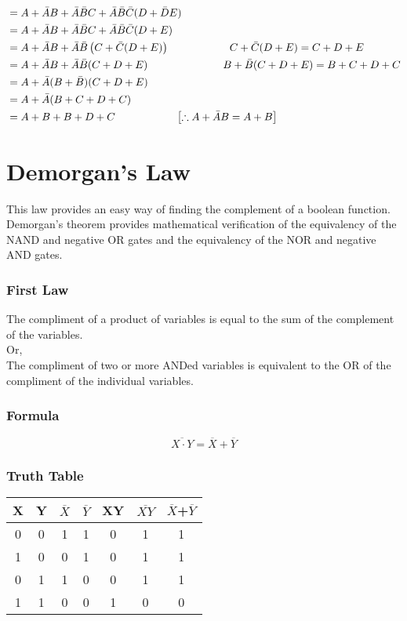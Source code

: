 \begin{answer}
	\begin{align*}
	&=A+\bar{A}B+\bar{A}\bar{B}C+\bar{A}\bar{B}\bar{C}(D+\bar{D}E)\\
	&=A+\bar{A}B+\bar{A}\bar{B}C+\bar{A}\bar{B}\bar{C}(D+E)\\
	&=A+\bar{A}B+\bar{A}\bar{B}\left( C+\bar{C}(D+E)\right) \hspace{2cm}C+\bar{C}(D+E)=C+D+E\\
	&=A+\bar{A}B+\bar{A}\bar{B}(C+D+E)\hspace{2.5cm}B+\bar{B}(C+D+E)=B+C+D+C\\
	&=A+\bar{A}(B+\bar{B})(C+D+E)\\
	&=A+\bar{A}(B+C+D+C)\\
	&=A+B+B+D+C\hspace{2cm}\left[ \therefore A+\bar{A}B=A+B\right] 
	\end{align*}
\end{answer}
\section{Demorgan's Law}
This law provides an easy way of finding the complement of a boolean function. Demorgan's theorem provides mathematical verification of the equivalency of the NAND and negative OR gates and the equivalency of the NOR and negative AND gates.
\subsubsection{First Law}
The compliment of a product of variables is equal to the sum of the complement of the variables.\\
Or,\\
The compliment of two or more ANDed variables is equivalent to the OR of the compliment of the individual variables.
\subsubsection{Formula}
$$\overline{X \cdot Y}=\overline{X}+\overline{Y}$$
\subsubsection{Truth Table}
\renewcommand*{\arraystretch}{1.5}
\begin{tabular}{|c|c|c|c|c|c|c|}
	\hline
	X&Y&$\overline{X}$&$\overline{Y}$&XY&$\overline{XY}$&$\overline{X}$+$\overline{Y}$\\
	\hline 0&0&1&1&0&1&1\\
	\hline 1&0&0&1&0&1&1\\
	\hline 0&1&1&0&0&1&1\\
	\hline 1&1&0&0&1&0&0\\
	\hline
\end{tabular}
